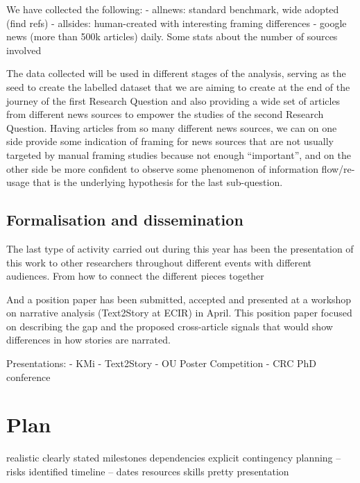 We have collected the following:
- allnews: standard benchmark, wide adopted (find refs)
- allsides: human-created with interesting framing differences
- google news (more than 500k articles) daily. Some stats about the number of sources involved

The data collected will be used in different stages of the analysis, serving as the seed to create the labelled dataset that we are aiming to create at the end of the journey of the first Research Question and also providing a wide set of articles from different news sources to empower the studies of the second Research Question.
Having articles from so many different news sources, we can on one side provide some indication of framing for news sources that are not usually targeted by manual framing studies because not enough ``important'', and on the other side be more confident to observe some phenomenon of information flow/re-usage that is the underlying hypothesis for the last sub-question.

\subsection{Formalisation and dissemination}
The last type of activity carried out during this year has been the presentation of this work to other researchers throughout different events with different audiences.
From how to connect the different pieces together

And a position paper has been submitted, accepted and presented at a workshop on narrative analysis (Text2Story at ECIR) in April.
This position paper focused on describing the gap and the proposed cross-article signals that would show differences in how stories are narrated.

Presentations:
- KMi
- Text2Story
- OU Poster Competition
- CRC PhD conference






\section{Plan}

realistic
clearly stated milestones
dependencies explicit
contingency planning – risks identified
timeline – dates
resources
skills
pretty presentation

